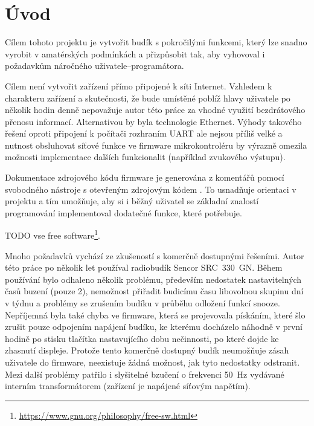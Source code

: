 \section*{Úvod}  %
Cílem tohoto projektu je vytvořit budík s pokročilými funkcemi, který lze
snadno vyrobit v amatérských podmínkách a přizpůsobit tak, aby vyhovoval
i požadavkům náročného uživatele--programátora. %

Cílem není vytvořit zařízení přímo připojené k síti Internet. Vzhledem
k charakteru zařízení a skutečnosti, že bude umístěné poblíž hlavy uživatele
po několik hodin denně nepovažuje autor této práce za vhodné využití
bezdrátového přenosu informací. Alternativou by byla technologie Ethernet.
Výhody takového řešení oproti připojení k počítači rozhraním UART ale nejsou
příliš velké a nutnost obsluhovat síťové funkce ve firmware mikrokontroléru by
výrazně omezila možnosti implementace dalších funkcionalit (například zvukového
výstupu).

Dokumentace zdrojového kódu firmware je generována z komentářů pomocí
svobodného nástroje s otevřeným zdrojovým kódem . To
usnadňuje orientaci v projektu a tím umožňuje, aby si i běžný uživatel se
základní znalostí programování implementoval dodatečné funkce, které potřebuje.

TODO vse free
software\footnote{\url{https://www.gnu.org/philosophy/free-sw.html}}.

Mnoho požadavků vychází ze zkušeností s komerčně dostupnými řešeními. Autor
této práce po několik let používal radiobudík Sencor SRC~330~GN.
Během používání bylo odhaleno několik problému, především nedostatek
nastavitelných časů buzení (pouze 2), nemožnost přiřadit budicímu času
libovolnou skupinu dní v týdnu a problémy se zrušením budíku v průběhu odložení
funkcí snooze. Nepříjemná byla také chyba ve firmware, která se
projevovala pískáním, které šlo zrušit pouze odpojením napájení budíku,
ke kterému docházelo náhodně v první hodině po stisku tlačítka nastavujícího
dobu nečinnosti, po které dojde ke zhasnutí displeje. Protože tento komerčně
dostupný budík neumožňuje zásah uživatele do firmware, neexistuje žádná
možnost, jak tyto nedostatky odstranit. Mezi další problémy patřilo
i slyšitelné bzučení o frekvenci \SI{50}{\hertz} vydávané interním
transformátorem (zařízení je napájené síťovým napětím).
